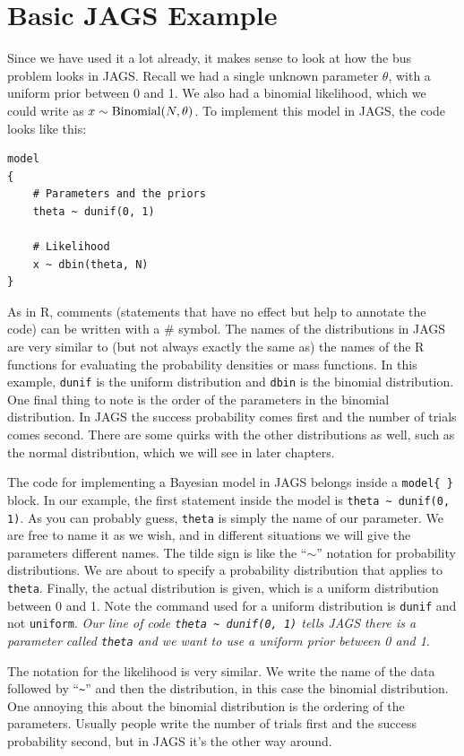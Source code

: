 \section{Basic JAGS Example}
Since we have used it a lot already, it makes sense to look at how the bus
problem looks in JAGS. Recall we had a
single unknown parameter $\theta$, with a uniform prior between 0 and 1.
We also had a binomial likelihood, which we could write as
$x \sim \textnormal{Binomial}(N, \theta)$.
To implement this model in JAGS, the code looks like this:
\begin{framed}
\begin{verbatim}
model
{
    # Parameters and the priors
    theta ~ dunif(0, 1)

    # Likelihood
    x ~ dbin(theta, N)
}
\end{verbatim}
\end{framed}
As in R, comments (statements that have no effect but help to annotate the
code) can be written with a \# symbol.
The names of the distributions in JAGS are very similar to (but not always
exactly the same as) the names of the R functions for evaluating the probability
densities or mass functions. In this example, {\tt dunif} is the uniform
distribution and {\tt dbin} is the binomial distribution. One final thing to
note is the order of the parameters in the binomial distribution. In JAGS the
success probability comes first and the number of trials comes second.
There are some quirks with the other distributions as well, such as the normal
distribution, which we will see in later chapters.

The code for implementing a Bayesian model in JAGS belongs inside
a {\tt model\{   \}} block.
In our example,
the first statement inside the model is {\tt theta \~{ } dunif(0, 1)}. As you
can probably guess, {\tt theta}
is simply the name of our parameter. We are free to name it as we
wish, and in different situations we will give the parameters different names.
The tilde sign is like the ``$\sim$'' notation for probability distributions.
We are
about to specify a probability distribution that applies to {\tt theta}. Finally,
the actual distribution is given, which is a uniform distribution between 0 and 1. Note
the command used for a uniform distribution is {\tt dunif} and not {\tt uniform}.
{\it Our line of code {\tt theta \~{ } dunif(0, 1)}
tells JAGS
there is a parameter called {\tt theta} and we want to use a uniform prior between
0 and 1}.

The notation for the likelihood is very similar. We write the name of the data
followed by ``{\tt \~{ }}'' and then the distribution, in this case the
binomial distribution.
One annoying this about the binomial distribution is the ordering of the parameters.
Usually people write the number of trials first and the success probability
second, but in JAGS it's the other way around.

